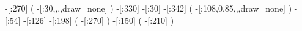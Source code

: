                  -[:270]%
                           (
         -[:30,,,,draw=none]%
                           )
                 -[:330]%
                  -[:30]%
                 -[:342]%
                           (
    -[:108,0.85,,,draw=none]%
                           )
                  -[:54]%
                 -[:126]%
                 -[:198]%
                           (
                     -[:270]%
                           )
                 -[:150]%
                           (
                     -[:210]%
                           )